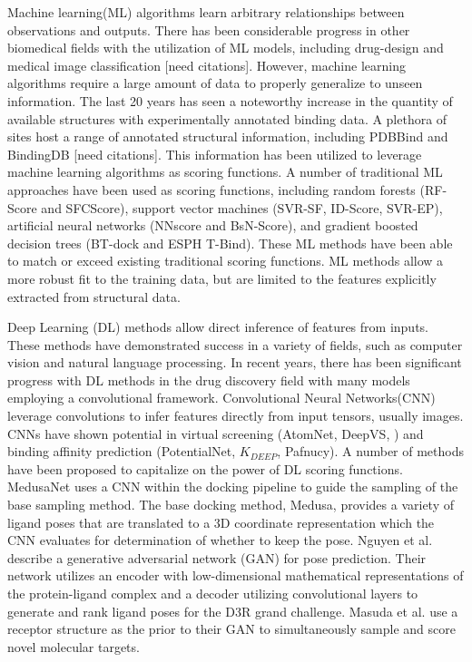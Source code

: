 \documentclass[journal=jcisd8,manuscript=article]{achemso}
\begin{document}
Machine learning(ML) algorithms learn arbitrary relationships between observations and outputs. There has been considerable progress in other biomedical fields with the utilization of ML models, including drug-design and medical image classification [need citations]. However, machine learning algorithms require a large amount of data to properly generalize to unseen information. The last 20 years has seen a noteworthy increase in the quantity of available structures with experimentally annotated binding data\cite{}. A plethora of sites host a range of annotated structural information, including PDBBind and BindingDB [need citations]. This information has been utilized to leverage machine learning algorithms as scoring functions. A number of traditional ML approaches have been used as scoring functions, including random forests (RF-Score and SFCScore), support vector machines (SVR-SF, ID-Score, SVR-EP), artificial neural networks (NNscore and BsN-Score), and gradient boosted decision trees (BT-dock and ESPH T-Bind)\cite{liu2017forging,zilian2013sfcscore,li2011svr,li2013idscore,durrant2010nnscore,ashtawy2015bsn,btdock,cang2018integration}. These ML methods have been able to match or exceed existing traditional scoring functions. ML methods allow a more robust fit to the training data, but are limited to the features explicitly extracted from structural data.

Deep Learning (DL) methods allow direct inference of features from inputs. These methods have demonstrated success in a variety of fields, such as computer vision and natural language processing\cite{krizhevsky2017imagenet,brown2020language}. In recent years, there has been significant progress with DL methods in the drug discovery field with many models employing a convolutional framework. Convolutional Neural Networks(CNN) leverage convolutions to infer features directly from input tensors, usually images. CNNs have shown potential in virtual screening (AtomNet, DeepVS, \cite{Ragoza2017}) and binding affinity prediction (PotentialNet, $K_{DEEP}$, Pafnucy)\cite{wallach2015atomnet,jimenez2018k,pereira2016boosting,feinberg2018potentialnet,stepniewska2018development}. A number of methods have been proposed to capitalize on the power of DL scoring functions. MedusaNet uses a CNN within the docking pipeline to guide the sampling of the base sampling method\cite{jiang2020guiding}. The base docking method, Medusa, provides a variety of ligand poses that are translated to a 3D coordinate representation which the CNN evaluates for determination of whether to keep the pose. Nguyen et al. \cite{nguyen2020mathdl} describe a generative adversarial network (GAN) for pose prediction. Their network utilizes an encoder with low-dimensional mathematical representations of the protein-ligand complex and a decoder utilizing convolutional layers to generate and rank ligand poses for the D3R grand challenge. Masuda et al. \cite{masuda2020generating} use a receptor structure as the prior to their GAN to simultaneously sample and score novel molecular targets.
\end{document}
